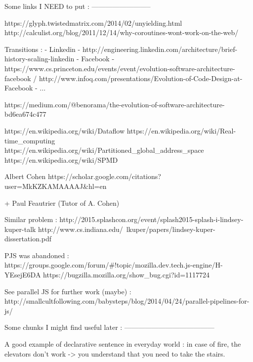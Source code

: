 Some links I NEED to put :
--------------------------

https://glyph.twistedmatrix.com/2014/02/unyielding.html
http://calculist.org/blog/2011/12/14/why-coroutines-wont-work-on-the-web/

Transitions :
  - Linkedin - http://engineering.linkedin.com/architecture/brief-history-scaling-linkedin
  - Facebook - https://www.cs.princeton.edu/events/event/evolution-software-architecture-facebook / http://www.infoq.com/presentations/Evolution-of-Code-Design-at-Facebook
  - ... 

https://medium.com/@benorama/the-evolution-of-software-architecture-bd6ea674c477

https://en.wikipedia.org/wiki/Dataflow
https://en.wikipedia.org/wiki/Real-time_computing
https://en.wikipedia.org/wiki/Partitioned_global_address_space
https://en.wikipedia.org/wiki/SPMD

Albert Cohen
https://scholar.google.com/citations?user=MkKZKAMAAAAJ&hl=en

+ Paul Feautrier (Tutor of A. Cohen)


Similar problem :
http://2015.splashcon.org/event/splash2015-splash-i-lindsey-kuper-talk
http://www.cs.indiana.edu/~lkuper/papers/lindsey-kuper-dissertation.pdf

PJS was abandoned :
https://groups.google.com/forum/#!topic/mozilla.dev.tech.js-engine/H-YEsejE6DA
https://bugzilla.mozilla.org/show_bug.cgi?id=1117724

See parallel JS for further work (maybe) :
http://smallcultfollowing.com/babysteps/blog/2014/04/24/parallel-pipelines-for-js/

Some chunks I might find useful later :
---------------------------------------

A good example of declarative sentence in everyday world : in case of fire, 
the elevators don't work -> you understand that you need to take the stairs.